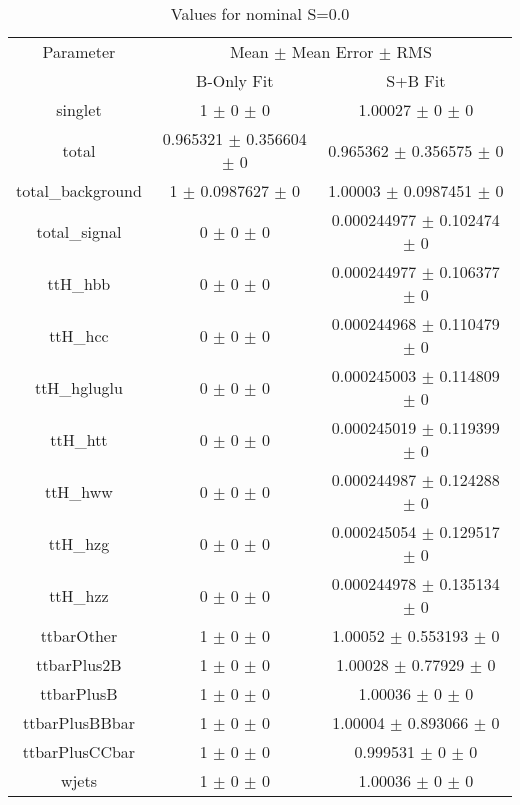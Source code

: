 \begin{table}
\centering
\caption{Values for nominal S=0.0}
\begin{tabular}{ccc}
\toprule
Parameter & \multicolumn{2}{c}{Mean $\pm$ Mean Error $\pm$ RMS}\\
 & B-Only Fit & S+B Fit\\
\midrule
singlet & \num{1} $\pm$ \num{0} $\pm$ \num{0} & \num{1.00027} $\pm$ \num{0} $\pm$ \num{0}\\
total & \num{0.965321} $\pm$ \num{0.356604} $\pm$ \num{0} & \num{0.965362} $\pm$ \num{0.356575} $\pm$ \num{0}\\
total\_background & \num{1} $\pm$ \num{0.0987627} $\pm$ \num{0} & \num{1.00003} $\pm$ \num{0.0987451} $\pm$ \num{0}\\
total\_signal & \num{0} $\pm$ \num{0} $\pm$ \num{0} & \num{0.000244977} $\pm$ \num{0.102474} $\pm$ \num{0}\\
ttH\_hbb & \num{0} $\pm$ \num{0} $\pm$ \num{0} & \num{0.000244977} $\pm$ \num{0.106377} $\pm$ \num{0}\\
ttH\_hcc & \num{0} $\pm$ \num{0} $\pm$ \num{0} & \num{0.000244968} $\pm$ \num{0.110479} $\pm$ \num{0}\\
ttH\_hgluglu & \num{0} $\pm$ \num{0} $\pm$ \num{0} & \num{0.000245003} $\pm$ \num{0.114809} $\pm$ \num{0}\\
ttH\_htt & \num{0} $\pm$ \num{0} $\pm$ \num{0} & \num{0.000245019} $\pm$ \num{0.119399} $\pm$ \num{0}\\
ttH\_hww & \num{0} $\pm$ \num{0} $\pm$ \num{0} & \num{0.000244987} $\pm$ \num{0.124288} $\pm$ \num{0}\\
ttH\_hzg & \num{0} $\pm$ \num{0} $\pm$ \num{0} & \num{0.000245054} $\pm$ \num{0.129517} $\pm$ \num{0}\\
ttH\_hzz & \num{0} $\pm$ \num{0} $\pm$ \num{0} & \num{0.000244978} $\pm$ \num{0.135134} $\pm$ \num{0}\\
ttbarOther & \num{1} $\pm$ \num{0} $\pm$ \num{0} & \num{1.00052} $\pm$ \num{0.553193} $\pm$ \num{0}\\
ttbarPlus2B & \num{1} $\pm$ \num{0} $\pm$ \num{0} & \num{1.00028} $\pm$ \num{0.77929} $\pm$ \num{0}\\
ttbarPlusB & \num{1} $\pm$ \num{0} $\pm$ \num{0} & \num{1.00036} $\pm$ \num{0} $\pm$ \num{0}\\
ttbarPlusBBbar & \num{1} $\pm$ \num{0} $\pm$ \num{0} & \num{1.00004} $\pm$ \num{0.893066} $\pm$ \num{0}\\
ttbarPlusCCbar & \num{1} $\pm$ \num{0} $\pm$ \num{0} & \num{0.999531} $\pm$ \num{0} $\pm$ \num{0}\\
wjets & \num{1} $\pm$ \num{0} $\pm$ \num{0} & \num{1.00036} $\pm$ \num{0} $\pm$ \num{0}\\
\bottomrule
\end{tabular}
\end{table}